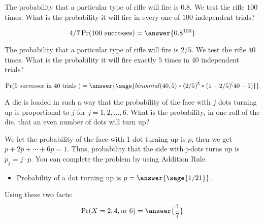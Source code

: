 \documentclass{ximera}
\begin{document}
\hspace{1cm}

\begin{problem}
The probability that a particular type of rifle will fire is $0.8$. We test the rifle $100$ times.
What is the probability it will fire in every one of $100$ independent trials? 

\begin{prompt}
\begin{equation*} 
4/7\Pr(100 \text{ successes} ) = \answer{0.8^{100}}
\end{equation*}
\end{prompt}
\end{problem}


\begin{problem}
The probability that a particular type of rifle will fire is $2/5$. We test the rifle $40$ times.
What is the probability it will fire exactly $5$ times in $40$ independent trials? 

\begin{explanation}
\begin{equation*} 
\Pr(5 \text{ successes in  } 40 \text{ trials } ) = \answer{\sage{binomial(40,5)*(2/5)^5*(1-2/5)^(40-5)}} 
\end{equation*}
\end{explanation}
\end{problem}



\begin{problem}
A die is loaded in such a way that the probability of the face with $j$ dots turning up is proportional to $j$ for $j = 1,2, \ldots,6$. What is the probability, in one roll of the die, that an even number of dots will turn up? 
\begin{hint}
We let the probability of the face with 1 dot turning up is $p$,
then we get $p+2p+\cdots+6p=1$.
Thus, probability that the side with j-dots turns up is $p_j=j\cdot p$.
You can complete the problem by using Addition Rule.
\end{hint}

\begin{prompt}
\begin{itemize}
    \item Probability of a dot turning up is $p=\answer{\sage{1/21}}$.
\end{itemize}
Using these two facts:
\begin{equation*}
\Pr(X=2, 4, \text{or } 6 ) =%
\answer{\frac{4}{7}}
\end{equation*}

\end{prompt}
\end{problem}
\end{document}
